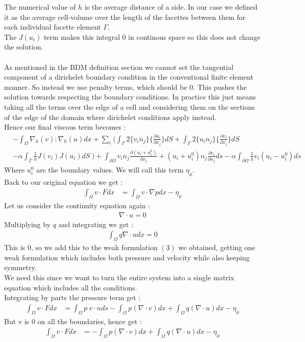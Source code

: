 \documentclass[11pt,twoside,a4paper]{article}
\begin{document}
The numerical value of $h$ is the average distance of a side. In our case we defined it as the average cell-volume over the length of the facettes between them for each individual facette element $\Gamma$.\\
The $J(u_i)$ term makes this integral $0$ in continous space so this does not change the solution.\\
\\
As mentioned in the BDM definition section we cannot set the tangential component of a dirichelet boundary condition in the conventional finite element manner.  So instead we use penalty terms, which should be $0$. This pushes the solution towards respecting the boundary conditions. In practice this just means taking all the terms over the edge of a cell and considering them on the sections of the edge of the domain where dirichelet conditions apply instead.\\
 Hence our final viscous term becomes :\\
\begin{align*}
&-  \int_\Omega \nabla_h(v) : \nabla_h(u) dx + \sum_e ( \int_\Gamma 2 \{ v_i n_j \} \{ \frac{\partial u_i}{\partial x_j}\} dS + \int_\Gamma 2 \{ u_i n_j \} \{ \frac{\partial v_i}{\partial x_j}\} dS \\
&- \alpha \int_\Gamma \frac{1}{h}  J(v_i) J(u_i) dS \ ) + \int_{\partial  \Omega} v_i n_j \frac{\partial(u_i + u^0_i)}{\partial x_j} + (u_i + u^0_i) n_j\frac{\partial v_i}{\partial x_j} ds - \alpha \int_{\partial \Omega} \frac{1}{h} v_i(u_i-u^0_i)ds
\end{align*}
Where $u^0_i$ are the boundary values.
We will call this term $\eta_\mu$.\\
Back to our original equation we get : 
\begin{align}
\int_\Omega v \cdot F dx &= \int_\Omega v \cdot \nabla p dx - \eta_\mu
\end{align}
Let us consider the continuity equation again :
\begin{align*}
\nabla \cdot u = 0
\end{align*}
Multiplying by $q$ and integrating we get :
\begin{align*}
\int_\Omega q \nabla \cdot u dx = 0
\end{align*}
This is $0$, so we add this to the weak formulation $(3)$ we obtained, getting one weak formulation which includes both pressure and velocity while also keeping symmetry. \\
We need this since we want to turn the entire system into a single matrix equation which includes all the conditions.\\
Integrating by parts the pressure term get :
\begin{align}
\int_\Omega v \cdot F dx &= \int_\Omega p \ v \cdot n ds - \int_\Omega  p ( \nabla \cdot v) dx + \int_\Omega q (\nabla \cdot u) dx  - \eta_\mu
\end{align}
But v is $0$ on all the boundaries, hence get :
\begin{align}
\int_\Omega v \cdot F dx &= - \int_\Omega  p ( \nabla \cdot v) dx + \int_\Omega q (\nabla \cdot u) dx  - \eta_\mu
\end{align}
\end{document}
